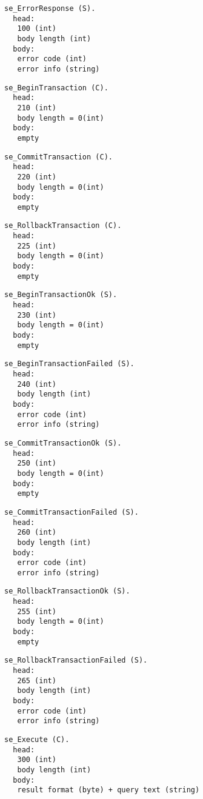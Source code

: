 \documentclass[a4paper,12pt]{article}
\begin{document}
\begin{verbatim}
se_ErrorResponse (S).
  head:
   100 (int)
   body length (int)
  body:
   error code (int)
   error info (string)
\end{verbatim}

\begin{verbatim}
se_BeginTransaction (C).
  head:
   210 (int)
   body length = 0(int)
  body:
   empty
\end{verbatim}

\begin{verbatim}
se_CommitTransaction (C).
  head:
   220 (int)
   body length = 0(int)
  body:
   empty
\end{verbatim}

\begin{verbatim}
se_RollbackTransaction (C).
  head:
   225 (int)
   body length = 0(int)
  body:
   empty
\end{verbatim}

\begin{verbatim}
se_BeginTransactionOk (S).
  head:
   230 (int)
   body length = 0(int)
  body:
   empty
\end{verbatim}

\begin{verbatim}
se_BeginTransactionFailed (S).
  head:
   240 (int)
   body length (int)
  body:
   error code (int)
   error info (string)
\end{verbatim}

\begin{verbatim}
se_CommitTransactionOk (S).
  head:
   250 (int)
   body length = 0(int)
  body:
   empty
\end{verbatim}

\begin{verbatim}
se_CommitTransactionFailed (S).
  head:
   260 (int)
   body length (int)
  body:
   error code (int)
   error info (string)
\end{verbatim}

\begin{verbatim}
se_RollbackTransactionOk (S).
  head:
   255 (int)
   body length = 0(int)
  body:
   empty
\end{verbatim}

\begin{verbatim}
se_RollbackTransactionFailed (S).
  head:
   265 (int)
   body length (int)
  body:
   error code (int)
   error info (string)
\end{verbatim}

\begin{verbatim}
se_Execute (C).
  head:
   300 (int)
   body length (int)
  body:
   result format (byte) + query text (string)
\end{verbatim}
\end{document}
